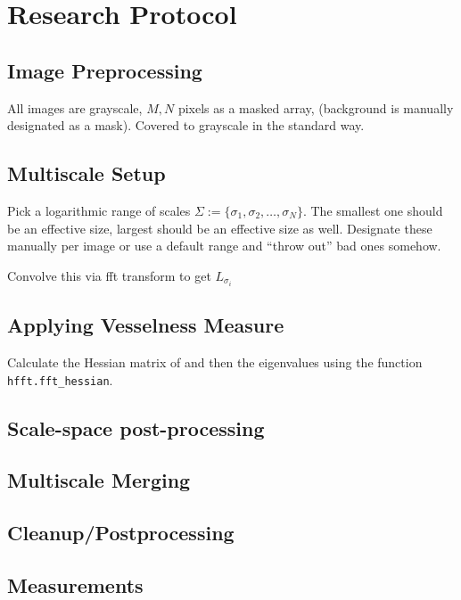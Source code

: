 \chapter{Research Protocol}


\section{Image Preprocessing}
	All images are grayscale, $M,N$ pixels as a masked array, (background is manually designated as a mask).
	Covered to grayscale in the standard way.
	
\section{Multiscale Setup}

	Pick a logarithmic range of scales $\Sigma := \{ \sigma_1, \sigma_2, \dots, \sigma_N\}$.
	The smallest one should be an effective size, largest should be an effective size as well. Designate these manually per image or use a default range and ``throw out'' bad ones somehow.
	
	Convolve this via fft transform to get $L_{\sigma_i}$
	
\section{Applying Vesselness Measure}
Calculate the Hessian matrix of  and then the eigenvalues using the function \texttt{hfft.fft\_hessian}.

\section{Scale-space post-processing}
\section{Multiscale Merging}
\section{Cleanup/Postprocessing}
\section{Measurements}

